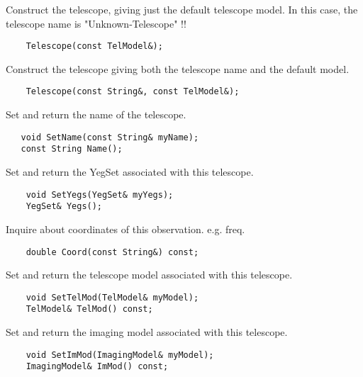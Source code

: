    Construct the telescope, giving just the default telescope model. In
   this case, the telescope name is "Unknown-Telescope" !!
\begin{verbatim}
    Telescope(const TelModel&);
\end{verbatim}

   Construct the telescope giving both the telescope name and the
   default model.
\begin{verbatim}
    Telescope(const String&, const TelModel&);
\end{verbatim}

   Set and return the name of the telescope.
\begin{verbatim}
   void SetName(const String& myName);
   const String Name();
\end{verbatim}
  
   Set and return the YegSet associated with this telescope.
\begin{verbatim}
    void SetYegs(YegSet& myYegs);
    YegSet& Yegs();
\end{verbatim}

   Inquire about coordinates of this observation. e.g. freq.
\begin{verbatim}
    double Coord(const String&) const;
\end{verbatim}

   Set and return the telescope model associated with this telescope.
\begin{verbatim}
    void SetTelMod(TelModel& myModel);
    TelModel& TelMod() const;
\end{verbatim}
  
   Set and return the imaging model associated with this telescope.
\begin{verbatim}
    void SetImMod(ImagingModel& myModel);
    ImagingModel& ImMod() const;
\end{verbatim}
